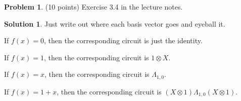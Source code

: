 \documentclass{article}
\theoremstyle{definition}
\newtheorem{problem}{Problem}
\newtheorem*{solution}{Solution}
\begin{document}
\begin{problem} (10 points)
Exercise 3.4 in the lecture notes. 
\end{problem}
\begin{solution}
Just write out where each basis vector goes and eyeball it.
\begin{compactenum}[(a)]
\item If $f(x) = 0$, then the corresponding circuit is just the identity.
\item If $f(x) = 1$, then the corresponding circuit is $1 \otimes X$.
\item If $f(x) = x$, then the corresponding circuit is $\Lambda_{1,0}$.
\item If $f(x) = 1+x$, then the corresponding circuit is $(X \otimes 1) \Lambda_{1,0} (X \otimes 1)$.
\end{compactenum}
\end{solution}
\end{document}
